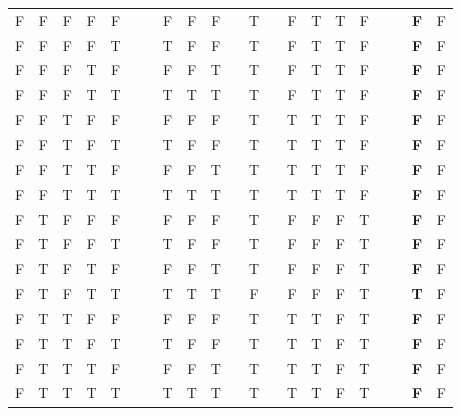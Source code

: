 \documentclass[a4paper,12pt]{article}
\begin{document}
\begin{enumerate}[label=\arabic*,leftmargin=*]
\begin{enumerate}[label=\arabic*.]
\begin{minipage}{\textwidth}
\begin{tabular}{c c c c c | c c c c c c c c c c c c c c c c}
                        \hline
                        F & F & F & F & F &   &   & F & F  & F &   & T   &   & F & T & T  & F &   &   & \textbf{F} & F\\
                        F & F & F & F & T &   &   & T & F  & F &   & T   &   & F & T & T  & F &   &   & \textbf{F} & F\\
                        F & F & F & T & F &   &   & F & F  & T &   & T   &   & F & T & T  & F &   &   & \textbf{F} & F\\
                        F & F & F & T & T &   &   & T & T  & T &   & T   &   & F & T & T  & F &   &   & \textbf{F} & F\\
                        F & F & T & F & F &   &   & F & F  & F &   & T   &   & T & T & T  & F &   &   & \textbf{F} & F\\
                        F & F & T & F & T &   &   & T & F  & F &   & T   &   & T & T & T  & F &   &   & \textbf{F} & F\\
                        F & F & T & T & F &   &   & F & F  & T &   & T   &   & T & T & T  & F &   &   & \textbf{F} & F\\
                        F & F & T & T & T &   &   & T & T  & T &   & T   &   & T & T & T  & F &   &   & \textbf{F} & F\\
                        F & T & F & F & F &   &   & F & F  & F &   & T   &   & F & F & F  & T &   &   & \textbf{F} & F\\
                        F & T & F & F & T &   &   & T & F  & F &   & T   &   & F & F & F  & T &   &   & \textbf{F} & F\\
                        F & T & F & T & F &   &   & F & F  & T &   & T   &   & F & F & F  & T &   &   & \textbf{F} & F\\
                        F & T & F & T & T &   &   & T & T  & T &   & F   &   & F & F & F  & T &   &   & \textbf{T} & F\\
                        F & T & T & F & F &   &   & F & F  & F &   & T   &   & T & T & F  & T &   &   & \textbf{F} & F\\
                        F & T & T & F & T &   &   & T & F  & F &   & T   &   & T & T & F  & T &   &   & \textbf{F} & F\\
                        F & T & T & T & F &   &   & F & F  & T &   & T   &   & T & T & F  & T &   &   & \textbf{F} & F\\
                        F & T & T & T & T &   &   & T & T  & T &   & T   &   & T & T & F  & T &   &   & \textbf{F} & F\\

\end{tabular}
\end{minipage}
\end{enumerate}
\end{enumerate}
\end{document}
